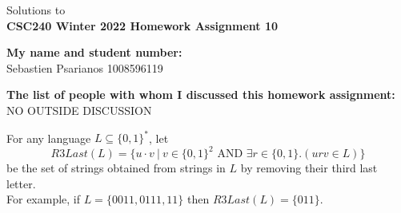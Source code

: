 \documentclass[11pt]{article}
\newcommand{\And}{\mbox{ AND }}
\begin{document}
\begin{center}
Solutions to\\
{\bf \Large \bf CSC240 Winter 2022 Homework Assignment 10}
\end{center}

\noindent
{\bf My name and student number:}\\
Sebastien Psarianos 1008596119
\medskip

\noindent
{\bf The list of people with whom I discussed this homework assignment:}\\
NO OUTSIDE DISCUSSION

\begin{question}
For any language $L \subseteq \{0,1\}^*$, let
$$R3Last(L) = \{ u \cdot v\ | \ v \in \{0,1\}^2  \And \exists r  \in \{0,1\}. (urv \in L)\}$$
be the set of strings obtained from  strings in $L$ by removing their third last letter.\\
For example, if $L = \{0011,0111, 11\}$ then $R3Last(L) = \{011\}$.
\end{question}
\end{document}
